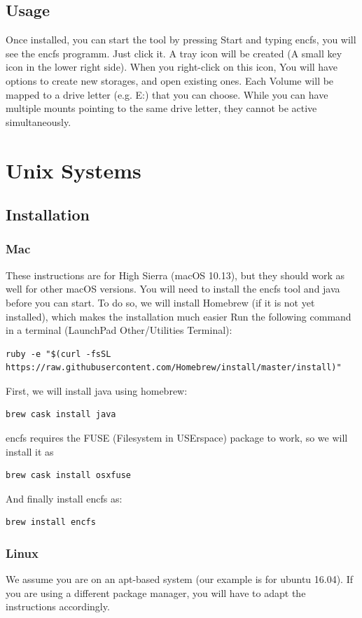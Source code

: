 \documentclass[a4paper,10pt]{report}
\begin{document}
\subsection{Usage}
Once installed, you can start the tool by pressing Start and typing encfs, you will see the encfs programm. Just click it.
A tray icon will be created (A small key icon in the lower right side). 
When you right-click on this icon, You will have options to create new storages, and open existing ones. 
Each Volume will be mapped to a drive letter (e.g. E:) that you can choose. 
While you can have multiple mounts pointing to the same drive letter, they cannot be active simultaneously.

\section{Unix Systems}

\subsection{Installation}
\subsubsection{Mac}
These instructions are for High Sierra (macOS 10.13), but they should work as well for other macOS versions.
You will need to install the encfs tool and java before you can start. To do so, we will install Homebrew (if it is not yet installed), which makes the installation much easier
Run the following command in a terminal (LaunchPad \textrightarrow Other/Utilities \textrightarrow Terminal):
\begin{lstlisting}
ruby -e "$(curl -fsSL https://raw.githubusercontent.com/Homebrew/install/master/install)"
\end{lstlisting}
First, we will install java using homebrew:
\begin{lstlisting}
brew cask install java
\end{lstlisting}
encfs requires the FUSE (Filesystem in USErspace) package to work, so we will install it as 
\begin{lstlisting}
brew cask install osxfuse
\end{lstlisting}
And finally install encfs as:
\begin{lstlisting}
brew install encfs
\end{lstlisting}



\subsubsection{Linux}
We assume you are on an apt-based system (our example is for ubuntu 16.04). If you are using a different package manager, you will have to adapt the instructions accordingly.
\end{document}
